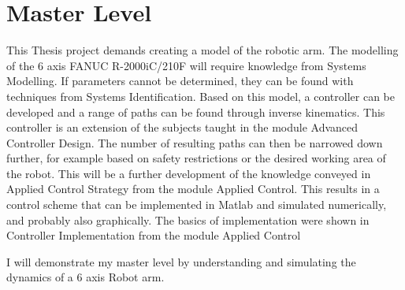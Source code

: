
\chapter{Master Level}

This Thesis project demands creating a model of the robotic arm. The modelling of the 6 axis FANUC R-2000iC/210F will require knowledge from Systems Modelling. If parameters cannot be determined, they can be found with techniques from Systems Identification. 
Based on this model, a controller can be developed and a range of paths can be found through inverse kinematics. This controller is an extension of the subjects taught in the module Advanced Controller Design. 
The number of resulting paths can then be narrowed down further, for example based on safety restrictions or the desired working area of the robot. This will be a further development of the knowledge conveyed in Applied Control Strategy from the module Applied Control. 
This results in a control scheme that can be implemented in Matlab and simulated numerically, and probably also graphically. The basics of implementation were shown in Controller Implementation from the module Applied Control

I will demonstrate my master level by understanding and simulating the dynamics of a 6 axis Robot arm. 

%
